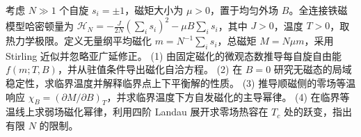 考虑 \(N\gg1\) 个自旋 \(s_i=\pm1\)，磁矩大小为 \(\mu>0\)，置于均匀外场 \(B\)。全连接铁磁模型哈密顿量为 \(\mathcal H_N=-\frac{J}{2N}(\sum_i s_i)^2-\mu B\sum_i s_i\)，其中 \(J>0\)，温度 \(T>0\)，取热力学极限。定义无量纲平均磁化 \(m=N^{-1}\sum_i s_i\)，总磁矩 \(M=N\mu m\)，采用 Stirling 近似并忽略亚广延修正。
(1) 由固定磁化的微观态数推导每自旋自由能 \(f(m;T,B)\)，并从驻值条件导出磁化自洽方程。
(2) 在 \(B=0\) 研究无磁态的局域稳定性，求临界温度并解释临界点上下平衡解的性质。
(3) 推导顺磁侧的零场等温响应 \(\chi_B=(\partial M/\partial B)_T\)，并求临界温度下方自发磁化的主导幂律。
(4) 在临界等温线上求弱场磁化幂律，利用四阶 Landau 展开求零场热容在 \(T_c\) 处的跃变，指出有限 \(N\) 的限制。
